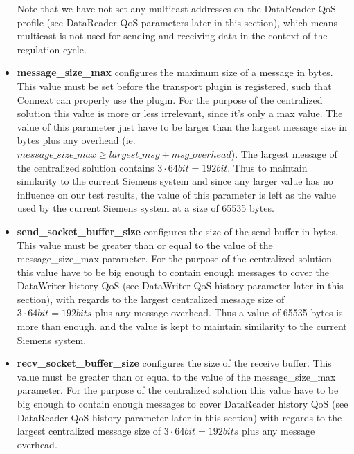 \begin{itemize}
	Note that we have not set any multicast addresses on the DataReader QoS profile (see DataReader QoS parameters later in this section), which means multicast is not used for sending and receiving data in the context of the regulation cycle.
	
	\item \textbf{message\_size\_max} configures the maximum size of a message in bytes. This value must be set before the transport plugin is registered, such that Connext can properly use the plugin. For the purpose of the centralized solution this value is more or less irrelevant, since it's only a max value. The value of this parameter just have to be larger than the largest message size in bytes plus any overhead (ie. $message\_size\_max \geq largest\_msg + msg\_overhead$). The largest message of the centralized solution contains $3\cdot64bit=192bit$. Thus to maintain similarity to the current Siemens system and since any larger value has no influence on our test results, the value of this parameter is left as the value used by the current Siemens system at a size of 65535 bytes.
	
	\item \textbf{send\_socket\_buffer\_size} configures the size of the send buffer in bytes. This value must be greater than or equal to the value of the message\_size\_max parameter. For the purpose of the centralized solution this value have to be big enough to contain enough messages to cover the DataWriter history QoS (see DataWriter QoS history parameter later in this section), with regards to the largest centralized message size of $3\cdot64bit=192bits$ plus any message overhead. Thus a value of 65535 bytes is more than enough, and the value is kept to maintain similarity to the current Siemens system.
	
	\item \textbf{recv\_socket\_buffer\_size} configures the size of the receive buffer. This value must be greater than or equal to the value of the message\_size\_max parameter. For the purpose of the centralized solution this value have to be big enough to contain enough messages to cover DataReader history QoS (see DataReader QoS history parameter later in this section) with regards to the largest centralized message size of $3\cdot64bit=192bits$ plus any message overhead. 
\end{itemize}

